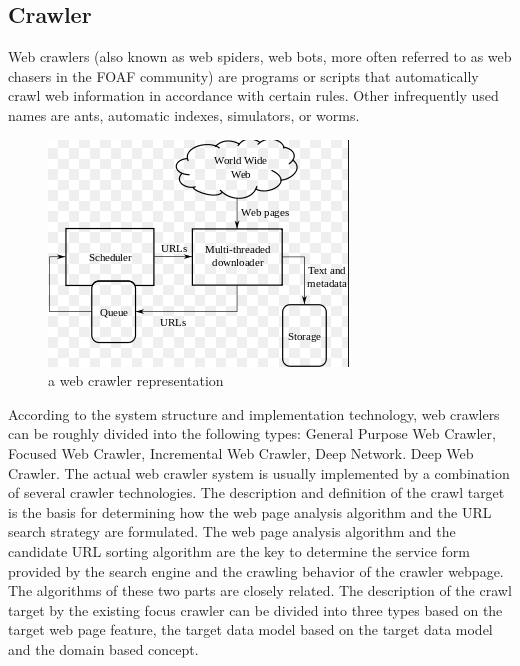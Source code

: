 \documentclass[10pt,times,twocolumn]{article}
\begin{document}
\subsection{Crawler}
Web crawlers (also known as web spiders, web bots, more often referred to as web chasers in the FOAF community) are programs or scripts that automatically crawl web information in accordance with certain rules. Other infrequently used names are ants, automatic indexes, simulators, or worms.
\begin{figure}[ht]
\centering
\includegraphics[scale=0.6]{fig/1.png}
\caption{a web crawler representation}
\label{fig:label}
\end{figure}
\newline
According to the system structure and implementation technology, web crawlers can be roughly divided into the following types: General Purpose Web Crawler, Focused Web Crawler, Incremental Web Crawler, Deep Network. Deep Web Crawler. The actual web crawler system is usually implemented by a combination of several crawler technologies.
\newline
The description and definition of the crawl target is the basis for determining how the web page analysis algorithm and the URL search strategy are formulated. The web page analysis algorithm and the candidate URL sorting algorithm are the key to determine the service form provided by the search engine and the crawling behavior of the crawler webpage. The algorithms of these two parts are closely related. The description of the crawl target by the existing focus crawler can be divided into three types based on the target web page feature, the target data model based on the target data model and the domain based concept.
\end{document}
